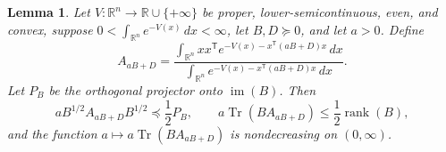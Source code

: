 \documentclass[11pt]{article}
\numberwithin{equation}{section}
\newtheorem{lemma}{Lemma}[section]
\theoremstyle{definition}
\begin{document}
\begin{lemma}
\label{run01:lem:energy-conclusions}
Let $V:\mathbb R^n\to\mathbb R\cup\{+\infty\}$ be proper, lower-semicontinuous,
even, and convex, suppose
$0<\int_{\mathbb R^n}e^{-V(x)}\,dx<\infty$, let
$B,D\succeq0$, and let
$a>0$.
Define
\[
 A_{aB+D}=
 \frac{\int_{\mathbb R^n}xx^{\mathsf T}
 e^{-V(x)-x^{\mathsf T}(aB+D)x}\,dx}
 {\int_{\mathbb R^n}e^{-V(x)-x^{\mathsf T}(aB+D)x}\,dx}.
\]
Let $P_B$ be the orthogonal projector onto
$\operatorname{im}(B)$.
Then
\begin{equation}
aB^{1/2}A_{aB+D}B^{1/2}\preceq\frac12P_B,
\qquad
a\operatorname{Tr}(BA_{aB+D}) \leq\frac12\operatorname{rank}(B),
\label{run01:eq:energy-domination}
\end{equation}
and the function $a\mapsto a\operatorname{Tr}(BA_{aB+D})$ is nondecreasing on
$(0,\infty)$.
\end{lemma}
\end{document}
